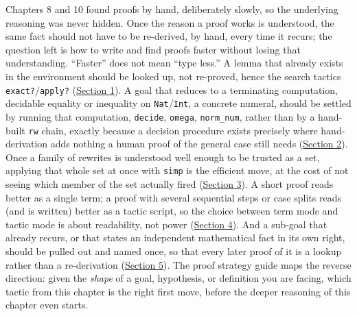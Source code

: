 Chapters 8 and 10 found proofs by hand, deliberately slowly, so the underlying reasoning was never hidden. Once the reason a proof works is understood, the same fact should not have to be re-derived, by hand, every time it recurs; the question left is how to write and find proofs faster without losing that understanding. ``Faster'' does not mean ``type less.'' A lemma that already exists in the environment should be looked up, not re-proved, hence the search tactics \texttt{exact?}/\texttt{apply?} (\hyperref[sec:13-working-efficiently:01-search-tactics:1]{Section 1}). A goal that reduces to a terminating computation, decidable equality or inequality on \texttt{Nat}/\texttt{Int}, a concrete numeral, should be settled by running that computation, \texttt{decide}, \texttt{omega}, \texttt{norm\_\allowbreak{}num}, rather than by a hand-built \texttt{rw} chain, exactly because a decision procedure exists precisely where hand-derivation adds nothing a human proof of the general case still needs (\hyperref[sec:13-working-efficiently:02-decision-procedures:1]{Section 2}). Once a family of rewrites is understood well enough to be trusted as a set, applying that whole set at once with \texttt{simp} is the efficient move, at the cost of not seeing which member of the set actually fired (\hyperref[sec:13-working-efficiently:03-simp:1]{Section 3}). A short proof reads better as a single term; a proof with several sequential steps or case splits reads (and is written) better as a tactic script, so the choice between term mode and tactic mode is about readability, not power (\hyperref[sec:13-working-efficiently:04-term-vs-tactic-mode:1]{Section 4}). And a sub-goal that already recurs, or that states an independent mathematical fact in its own right, should be pulled out and named once, so that every later proof of it is a lookup rather than a re-derivation (\hyperref[sec:13-working-efficiently:05-structuring-lemmas:1]{Section 5}). The proof strategy guide maps the reverse direction: given the \emph{shape} of a goal, hypothesis, or definition you are facing, which tactic from this chapter is the right first move, before the deeper reasoning of this chapter even starts.







